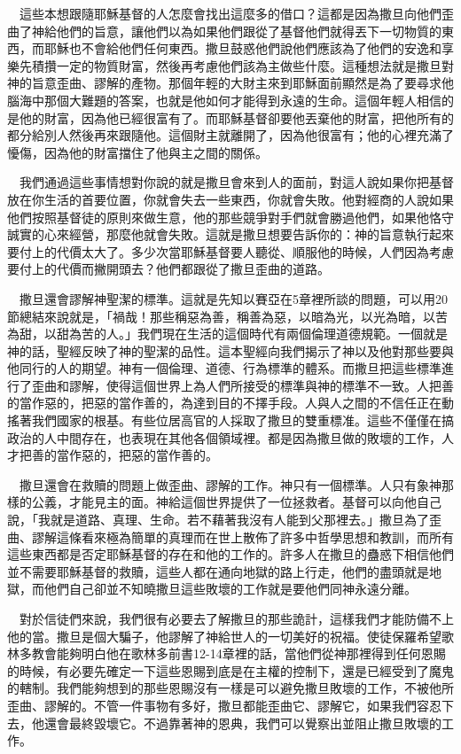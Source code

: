 \documentclass{book}
\begin{document}
　這些本想跟隨耶穌基督的人怎麼會找出這麼多的借口？這都是因為撒旦向他們歪曲了神給他們的旨意，讓他們以為如果他們跟從了基督他們就得丟下一切物質的東西，而耶穌也不會給他們任何東西。撒旦鼓惑他們說他們應該為了他們的安逸和享樂先積攢一定的物質財富，然後再考慮他們該為主做些什麼。這種想法就是撒旦對神的旨意歪曲、謬解的產物。那個年輕的大財主來到耶穌面前顯然是為了要尋求他腦海中那個大難題的答案，也就是他如何才能得到永遠的生命。這個年輕人相信的是他的財富，因為他已經很富有了。而耶穌基督卻要他丟棄他的財富，把他所有的都分給別人然後再來跟隨他。這個財主就離開了，因為他很富有；他的心裡充滿了懮傷，因為他的財富擋住了他與主之間的關係。

　我們通過這些事情想對你說的就是撒旦會來到人的面前，對這人說如果你把基督放在你生活的首要位置，你就會失去一些東西，你就會失敗。他對經商的人說如果他們按照基督徒的原則來做生意，他的那些競爭對手們就會勝過他們，如果他恪守誠實的心來經營，那麼他就會失敗。這就是撒旦想要告訴你的：神的旨意執行起來要付上的代價太大了。多少次當耶穌基督要人聽從、順服他的時候，人們因為考慮要付上的代價而撇開頭去？他們都跟從了撒旦歪曲的道路。

　撒旦還會謬解神聖潔的標準。這就是先知以賽亞在5章裡所談的問題，可以用20節總結來說就是，「禍哉！那些稱惡為善，稱善為惡，以暗為光，以光為暗，以苦為甜，以甜為苦的人。」我們現在生活的這個時代有兩個倫理道德規範。一個就是神的話，聖經反映了神的聖潔的品性。這本聖經向我們揭示了神以及他對那些要與他同行的人的期望。神有一個倫理、道德、行為標準的體系。而撒旦把這些標準進行了歪曲和謬解，使得這個世界上為人們所接受的標準與神的標準不一致。人把善的當作惡的，把惡的當作善的，為達到目的不擇手段。人與人之間的不信任正在動搖著我們國家的根基。有些位居高官的人採取了撒旦的雙重標准。這些不僅僅在搞政治的人中間存在，也表現在其他各個領域裡。都是因為撒旦做的敗壞的工作，人才把善的當作惡的，把惡的當作善的。

　撒旦還會在救贖的問題上做歪曲、謬解的工作。神只有一個標準。人只有象神那樣的公義，才能見主的面。神給這個世界提供了一位拯救者。基督可以向他自己說，「我就是道路、真理、生命。若不藉著我沒有人能到父那裡去。」撒旦為了歪曲、謬解這條看來極為簡單的真理而在世上散佈了許多中哲學思想和教訓，而所有這些東西都是否定耶穌基督的存在和他的工作的。許多人在撒旦的蠱惑下相信他們並不需要耶穌基督的救贖，這些人都在通向地獄的路上行走，他們的盡頭就是地獄，而他們自己卻並不知曉撒旦這些敗壞的工作就是要他們同神永遠分離。

　對於信徒們來說，我們很有必要去了解撒旦的那些詭計，這樣我們才能防備不上他的當。撒旦是個大騙子，他謬解了神給世人的一切美好的祝福。使徒保羅希望歌林多教會能夠明白他在歌林多前書12-14章裡的話，當他們從神那裡得到任何恩賜的時候，有必要先確定一下這些恩賜到底是在主權的控制下，還是已經受到了魔鬼的轄制。我們能夠想到的那些恩賜沒有一樣是可以避免撒旦敗壞的工作，不被他所歪曲、謬解的。不管一件事物有多好，撒旦都能歪曲它、謬解它，如果我們容忍下去，他還會最終毀壞它。不過靠著神的恩典，我們可以覺察出並阻止撒旦敗壞的工作。
\end{document}
